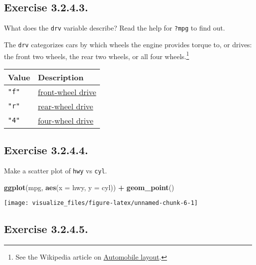 \documentclass[]{book}
\newenvironment{Shaded}{\begin{snugshade}}{\end{snugshade}}
\newcommand{\DataTypeTok}[1]{\textcolor[rgb]{0.13,0.29,0.53}{#1}}
\newcommand{\KeywordTok}[1]{\textcolor[rgb]{0.13,0.29,0.53}{\textbf{#1}}}
\newcommand{\NormalTok}[1]{#1}
\newcommand{\OperatorTok}[1]{\textcolor[rgb]{0.81,0.36,0.00}{\textbf{#1}}}
\newcommand{\StringTok}[1]{\textcolor[rgb]{0.31,0.60,0.02}{#1}}
\let\rmarkdownfootnote\footnote%
\def\footnote{\protect\rmarkdownfootnote}
\theoremstyle{plain}
\theoremstyle{remark}
\begin{document}
\hypertarget{exercise-3.2.4.3.}{%
\subsection*{\texorpdfstring{Exercise
{3.2.4.3}.}{Exercise 3.2.4.3.}}\label{exercise-3.2.4.3.}}

What does the \texttt{drv} variable describe? Read the help for
\texttt{?mpg} to find out.

The \texttt{drv} categorizes cars by which wheels the engine provides
torque to, or drives: the front two wheels, the rear two wheels, or all
four wheels.\footnote{See the Wikipedia article on
  \href{https://en.wikipedia.org/wiki/Automobile_layout}{Automobile
  layout}.}

\begin{longtable}[]{@{}ll@{}}
\toprule
Value & Description\tabularnewline
\midrule
\endhead
\texttt{"f"} &
\href{https://en.wikipedia.org/wiki/Front-wheel_drive}{front-wheel
drive}\tabularnewline
\texttt{"r"} &
\href{https://en.wikipedia.org/wiki/Automobile_layout\#Rear-wheel-drive_layouts}{rear-wheel
drive}\tabularnewline
\texttt{"4"} &
\href{https://en.wikipedia.org/wiki/Four-wheel_drive}{four-wheel
drive}\tabularnewline
\bottomrule
\end{longtable}

\hypertarget{exercise-3.2.4.4.}{%
\subsection*{\texorpdfstring{Exercise
{3.2.4.4}.}{Exercise 3.2.4.4.}}\label{exercise-3.2.4.4.}}

Make a scatter plot of \texttt{hwy} vs \texttt{cyl}.

\begin{Shaded}
\begin{Highlighting}[]
\KeywordTok{ggplot}\NormalTok{(mpg, }\KeywordTok{aes}\NormalTok{(}\DataTypeTok{x =}\NormalTok{ hwy, }\DataTypeTok{y =}\NormalTok{ cyl)) }\OperatorTok{+}
\StringTok{  }\KeywordTok{geom_point}\NormalTok{()}
\end{Highlighting}
\end{Shaded}

\begin{center}\texttt{[image: visualize\_files/figure-latex/unnamed-chunk-6-1]} \end{center}

\hypertarget{exercise-3.2.4.5.}{%
\subsection*{\texorpdfstring{Exercise
{3.2.4.5}.}{Exercise 3.2.4.5.}}\label{exercise-3.2.4.5.}}
\end{document}
